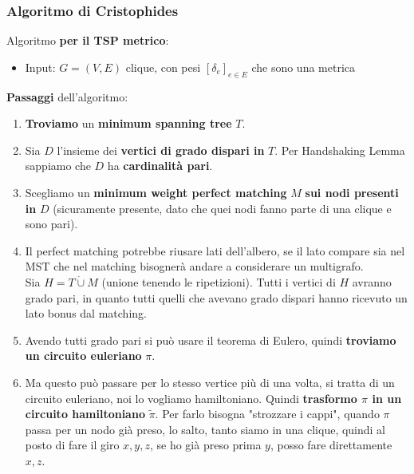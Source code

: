 \newpage

\subsubsection{Algoritmo di Cristophides}

Algoritmo \textbf{per il TSP metrico}:
\begin{itemize}
	\item Input: $G = (V,E)$ clique, con pesi $[\delta_e]_{e \in E}$ che sono una metrica
\end{itemize}

\textbf{Passaggi} dell'algoritmo:
\begin{enumerate}
	\item \textbf{Troviamo} un \textbf{minimum spanning tree} $T$.\\
	
	\item Sia $D$ l'insieme dei \textbf{vertici di grado dispari in} $T$. Per Handshaking Lemma sappiamo che $D$ ha \textbf{cardinalità pari}.\\
	
	\item Scegliamo un \textbf{minimum weight perfect matching} $M$ \textbf{sui nodi presenti in} $D$ (sicuramente presente, dato che quei nodi fanno parte di una clique e sono pari).\\ 
	
	\item Il perfect matching potrebbe riusare lati dell'albero, se il lato compare sia nel MST che nel matching bisognerà andare a considerare un multigrafo. \\
	Sia $H = T \dot{\cup} M$ (unione tenendo le ripetizioni). Tutti i vertici di $H$ avranno grado pari, in quanto tutti quelli che avevano grado dispari hanno ricevuto un lato bonus dal matching.\\
	
	\item Avendo tutti grado pari si può usare il teorema di Eulero, quindi \textbf{troviamo un circuito euleriano} $\pi$.\\
	
	\item Ma questo può passare per lo stesso vertice più di una volta, si tratta di un circuito euleriano, noi lo vogliamo hamiltoniano. Quindi \textbf{trasformo $\pi$ in un circuito hamiltoniano} $\tilde \pi$. Per farlo bisogna "strozzare i cappi", quando $\pi$ passa per un nodo già preso, lo salto, tanto siamo in una clique, quindi al posto di fare il giro $x, y, z$, se ho già preso prima $y$, posso fare direttamente $x,z$.\\
\end{enumerate}

